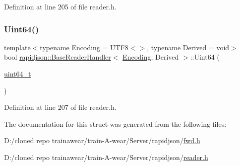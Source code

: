 Definition at line 205 of file reader.\+h.


\begin{DoxyCode}{0}

\end{DoxyCode}
\mbox{\label{structrapidjson_1_1_base_reader_handler_a76b043fefd5fac0faadf3846995af6f5}} 
\subsubsection{\texorpdfstring{Uint64()}{Uint64()}}
{\footnotesize\ttfamily template$<$typename Encoding = U\+T\+F8$<$$>$, typename Derived = void$>$ \\
bool \mbox{\hyperlink{structrapidjson_1_1_base_reader_handler}{rapidjson\+::\+Base\+Reader\+Handler}}$<$ \mbox{\hyperlink{classrapidjson_1_1_encoding}{Encoding}}, Derived $>$\+::Uint64 (\begin{DoxyParamCaption}\item[{\mbox{\hyperlink{stdint_8h_aec6fcb673ff035718c238c8c9d544c47}{uint64\+\_\+t}}}]{ }\end{DoxyParamCaption})}



Definition at line 207 of file reader.\+h.


\begin{DoxyCode}{0}

\end{DoxyCode}


The documentation for this struct was generated from the following files\+:\begin{DoxyCompactItemize}
\item 
D\+:/cloned repo trainawear/train-\/\+A-\/wear/\+Server/rapidjson/\mbox{\hyperlink{fwd_8h}{fwd.\+h}}\item 
D\+:/cloned repo trainawear/train-\/\+A-\/wear/\+Server/rapidjson/\mbox{\hyperlink{reader_8h}{reader.\+h}}\end{DoxyCompactItemize}
